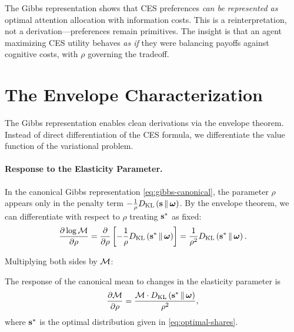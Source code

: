 \begin{calloutnote}
The Gibbs representation shows that CES preferences \emph{can be represented as} optimal attention allocation with information costs. This is a reinterpretation, not a derivation---preferences remain primitives. The insight is that an agent maximizing CES utility behaves \emph{as if} they were balancing payoffs against cognitive costs, with $\rho$ governing the tradeoff.
\end{calloutnote}

\section{The Envelope Characterization}

The Gibbs representation enables clean derivations via the envelope theorem. Instead of direct differentiation of the CES formula, we differentiate the value function of the variational problem.

\paragraph{Response to the Elasticity Parameter.}

In the canonical Gibbs representation \cref{eq:gibbs-canonical}, the parameter $\rho$ appears only in the penalty term $-\frac{1}{\rho}D_{\mathrm{KL}}\left(\mathbf{s} \,\|\, \boldsymbol{\omega}\right)$. By the envelope theorem, we can differentiate with respect to $\rho$ treating $\mathbf{s}^*$ as fixed:
\begin{equation}
\frac{\partial \log \mathcal{M}}{\partial \rho} = \frac{\partial}{\partial \rho}\left[ -\frac{1}{\rho} D_{\mathrm{KL}}\left(\mathbf{s}^* \,\|\, \boldsymbol{\omega}\right) \right] = \frac{1}{\rho^2} D_{\mathrm{KL}}\left(\mathbf{s}^* \,\|\, \boldsymbol{\omega}\right).
\end{equation}

Multiplying both sides by $\mathcal{M}$:

\begin{proposition}
\label{prop:envelope-rho}
The response of the canonical mean to changes in the elasticity parameter is
\begin{equation}
\label{eq:dM-drho}
\frac{\partial \mathcal{M}}{\partial \rho} = \frac{\mathcal{M} \cdot D_{\mathrm{KL}}\left(\mathbf{s}^* \,\|\, \boldsymbol{\omega}\right)}{\rho^2},
\end{equation}
where $\mathbf{s}^*$ is the optimal distribution given in \cref{eq:optimal-shares}.
\end{proposition}

